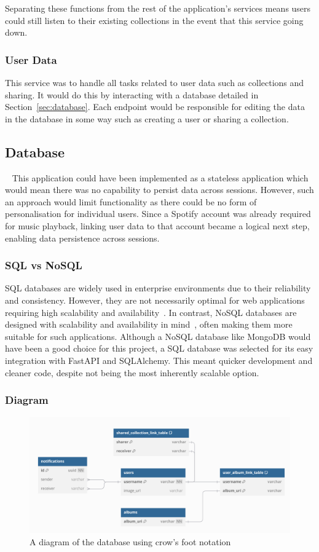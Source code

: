 Separating these functions from the rest of the application’s services means users could still listen to their existing collections in the event that this service going down.

\subsubsection{User Data}
This service was to handle all tasks related to user data such as collections and sharing. It would do this by interacting with a database detailed in Section~\ref{sec:database}. Each endpoint would be responsible for editing the data in the database in some way such as creating a user or sharing a collection.

\subsection{Database}~\label{sec:database}
This application could have been implemented as a stateless application which would  mean there was no capability to persist data across sessions. However, such an approach would limit functionality as there could be no form of personalisation for individual users. Since a Spotify account was already required for music playback, linking user data to that account became a logical next step, enabling data persistence across sessions.

\subsubsection{SQL vs NoSQL}
SQL databases are widely used in enterprise environments due to their reliability and consistency. However, they are not necessarily optimal for web applications requiring high scalability and availability~\cite{GANESHCHANDRA201513}. In contrast, NoSQL databases are designed with scalability and availability in mind~\cite{NoSQL}, often making them more suitable for such applications.
Although a NoSQL database like MongoDB would have been a good choice for this project, a SQL database was selected for its easy integration with FastAPI and SQLAlchemy. This meant quicker development and cleaner code, despite not being the most inherently scalable option.

\subsubsection{Diagram}
\begin{figure} [H]
    \centering
    \includegraphics[width=0.6\linewidth]{figures/db_diagram.png}
    \caption{A diagram of the database using crow's foot notation}
    \label{fig:database-diagram}
\end{figure}

